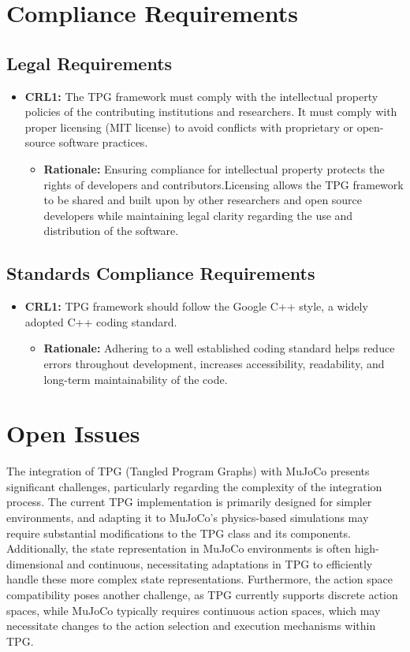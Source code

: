 \documentclass[12pt]{article}
\begin{document}
\section{Compliance Requirements}
\subsection{Legal Requirements}
\begin{itemize}
  \item \textbf{CRL1:}  The TPG framework must comply with the intellectual property policies of the contributing institutions and researchers. It must comply with proper licensing (MIT license) to avoid conflicts with proprietary or open-source software practices.

      \begin{itemize}
        \item \textbf{Rationale:} Ensuring compliance for intellectual property protects the rights of developers and contributors.Licensing allows the TPG framework to be shared and built upon by other researchers and open source developers while maintaining legal clarity regarding the use and distribution of the software.
      \end{itemize}
\end{itemize}

\subsection{Standards Compliance Requirements}
\begin{itemize}
  \item \textbf{CRL1:}  TPG framework should follow the Google C++ style, a widely adopted C++ coding standard.

      \begin{itemize}
        \item \textbf{Rationale:} Adhering to a well established coding standard helps reduce errors throughout development, increases accessibility, readability, and long-term maintainability of the code.
      \end{itemize}
\end{itemize}
\section{Open Issues}
The integration of TPG (Tangled Program Graphs) with MuJoCo presents significant challenges, particularly regarding the complexity of the integration process. The current TPG implementation is primarily designed for simpler environments, and adapting it to MuJoCo's physics-based simulations may require substantial modifications to the TPG class and its components. Additionally, the state representation in MuJoCo environments is often high-dimensional and continuous, necessitating adaptations in TPG to efficiently handle these more complex state representations. Furthermore, the action space compatibility poses another challenge, as TPG currently supports discrete action spaces, while MuJoCo typically requires continuous action spaces, which may necessitate changes to the action selection and execution mechanisms within TPG.
\end{document}
